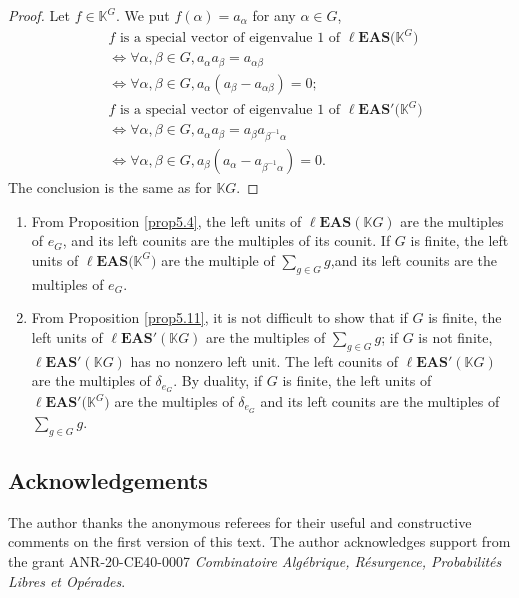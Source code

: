 \documentclass[10pt,a4paper]{amsart}
\numberwithin{equation}{section}
\newcommand{\leas}{\ell\mathbf{EAS}}
\begin{document}
\begin{proof}
Let $f\in \mathbb{K}^G$. We put $f(\alpha)=a_\alpha$ for any $\alpha \in G$,
\begin{align*}
&f\text{ is a special vector of eigenvalue 1 of }\leas\bigl(\mathbb{K}^G\bigr)\\
&\Longleftrightarrow\forall \alpha,\beta \in G, a_\alpha a_\beta=a_{\alpha\beta}\\
&\Longleftrightarrow\forall \alpha,\beta \in G, a_\alpha(a_\beta-a_{\alpha\beta})=0;\\
&f\text{ is a special vector of eigenvalue 1 of }\leas'\bigl(\mathbb{K}^G\bigr)\\
&\Longleftrightarrow\forall \alpha,\beta \in G, a_\alpha a_\beta=a_\beta a_{\beta^{-1}\alpha}\\
&\Longleftrightarrow\forall \alpha,\beta \in G, a_\beta(a_\alpha-a_{\beta^{-1}\alpha})=0.
\end{align*}
The conclusion is the same as for $\mathbb{K} G$. \end{proof}

\begin{Remark}\quad
\begin{enumerate}\itemsep=0pt
\item[(1)] From Proposition \ref{prop5.4}, the left units of $\leas(\mathbb{K} G)$ are the multiples of $e_G$, and its left counits are the multiples of its counit.
If $G$ is finite, the left units of $\leas\bigl(\mathbb{K}^G\bigr)$ are the multiple of $ \sum_{g\in G} g$,and its left counits are the multiples of $e_G$.
\item[(2)] From Proposition \ref{prop5.11}, it is not difficult to show that if $G$ is finite, the left units of $\leas'(\mathbb{K} G)$ are the multiples of $ \sum_{g\in G} g$; if $G$ is not finite, $\leas'(\mathbb{K} G)$ has no nonzero left unit.
The left counits of $\leas'(\mathbb{K} G)$ are the multiples of $\delta_{e_G}$.
By duality, if $G$ is finite, the left units of $\leas'\bigl(\mathbb{K}^G\bigr)$ are the multiples of $\delta_{e_G}$ and its left counits are the multiples of $ \sum_{g\in G} g$.
\end{enumerate}\end{Remark}

\subsection*{Acknowledgements}

The author thanks the anonymous referees for their useful and constructive comments on the first version of this text. The author acknowledges support from the grant ANR-20-CE40-0007 \emph{Combinatoire Alg\'e\-brique, R\'esurgence, Probabilit\'es Libres et Op\'erades}.
\end{document}
